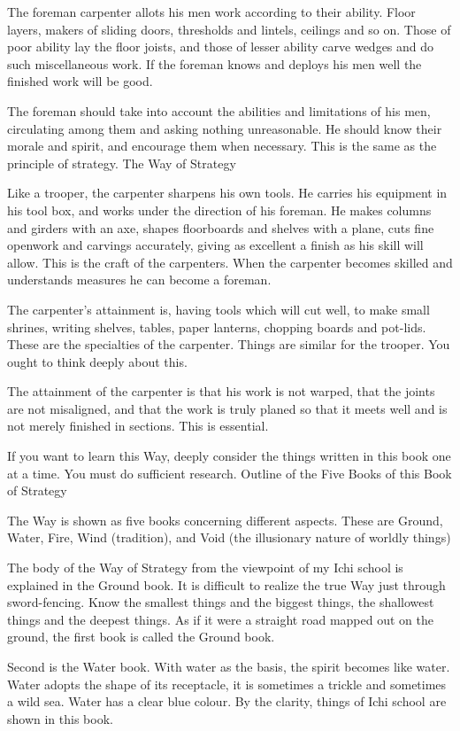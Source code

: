 The foreman carpenter allots his men work according to their ability. Floor layers, makers of sliding doors, thresholds and lintels, ceilings and so on. Those of poor ability lay the floor joists, and those of lesser ability carve wedges and do such miscellaneous work. If the foreman knows and deploys his men well the finished work will be good.

The foreman should take into account the abilities and limitations of his men, circulating among them and asking nothing unreasonable. He should know their morale and spirit, and encourage them when necessary. This is the same as the principle of strategy.
The Way of Strategy

Like a trooper, the carpenter sharpens his own tools. He carries his equipment in his tool box, and works under the direction of his foreman. He makes columns and girders with an axe, shapes floorboards and shelves with a plane, cuts fine openwork and carvings accurately, giving as excellent a finish as his skill will allow. This is the craft of the carpenters. When the carpenter becomes skilled and understands measures he can become a foreman.

The carpenter's attainment is, having tools which will cut well, to make small shrines, writing shelves, tables, paper lanterns, chopping boards and pot-lids. These are the specialties of the carpenter. Things are similar for the trooper. You ought to think deeply about this.

The attainment of the carpenter is that his work is not warped, that the joints are not misaligned, and that the work is truly planed so that it meets well and is not merely finished in sections. This is essential.

If you want to learn this Way, deeply consider the things written in this book one at a time. You must do sufficient research.
Outline of the Five Books of this Book of Strategy

The Way is shown as five books concerning different aspects. These are Ground, Water, Fire, Wind (tradition), and Void (the illusionary nature of worldly things)

The body of the Way of Strategy from the viewpoint of my Ichi school is explained in the Ground book. It is difficult to realize the true Way just through sword-fencing. Know the smallest things and the biggest things, the shallowest things and the deepest things. As if it were a straight road mapped out on the ground, the first book is called the Ground book.

Second is the Water book. With water as the basis, the spirit becomes like water. Water adopts the shape of its receptacle, it is sometimes a trickle and sometimes a wild sea. Water has a clear blue colour. By the clarity, things of Ichi school are shown in this book.

